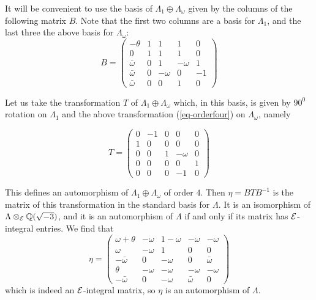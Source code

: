 It will be convenient to use the basis of $\Lambda_1\oplus\Lambda_\omega$ given by the
columns of the following matrix $B$. Note that the first two columns are a basis for
$\Lambda_1$, and the last three the above basis for $\Lambda_\omega$: \begin{equation}
\label{eq-basis} B = \left(\begin{array}{ccccc} -\theta & 1 & 1 & 1 & 0 \\0 & 1 & 1 & 1
& 0 \\\bar\omega & 0 & 1 & -\omega & 1 \\ \bar\omega & 0 & -\omega & 0 & -1 \\
\bar\omega & 0 & 0 & 1 & 0\end{array}\right) \end{equation}



 Let us take the transformation $T$ of $\Lambda_1\oplus\Lambda_\omega$ which, in this
basis, is given by $90^0$ rotation on $\Lambda_1$ and the above transformation
(\ref{eq-orderfour}) on $\Lambda_\omega$, namely

\begin{equation}
\label{eq-splittransformation} T = \left(\begin{array}{ccccc}0 & -1 & 0 & 0 & 0 \\ 1 &
0 & 0 & 0 & 0 \\0 & 0 & 1 & -\omega & 0 \\0 & 0 & 0 & 0 & 1 \\0 & 0 & 0 & -1 &
0\end{array}\right) \end{equation}

This defines an automorphism of
$\Lambda_1\oplus\Lambda_\omega$ of order $4$. Then $\eta = BTB^{-1}$ is the matrix of
this transformation in the standard basis for $\Lambda$. It is an isomorphism of
$\Lambda\otimes_{ \mathcal E } { \mathbb Q }(\sqrt{-3})$, and it is an automorphism of $\Lambda$ if and
only if its matrix has ${ \mathcal E }$- integral entries. We find that \begin{equation}
\label{eq-integrality} \eta = \left(\begin{array}{ccccc} \omega + \theta & -\omega &
1-\omega & -\omega & -\omega \\ \omega & -\omega & 1 & 0 & 0 \\ -\bar\omega & 0 &
-\omega & 0 & \bar\omega \\ \theta & -\omega & -\omega & -\omega & -\omega \\
-\bar\omega & 0 & -\omega & \bar\omega & 0\end{array}\right) \end{equation} which is
indeed an ${ \mathcal E }$-integral matrix, so $\eta$ is an automorphism of $\Lambda$.



